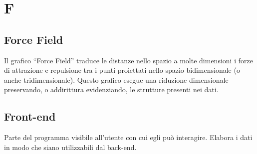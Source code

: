 \section*{F}
\markright{}
\subsection*{Force Field}
Il grafico “Force Field” traduce le distanze nello spazio a molte dimensioni i forze di attrazione e repulsione tra i punti proiettati nello spazio bidimensionale (o anche tridimensionale).
Questo grafico esegue una riduzione dimensionale preservando, o addirittura evidenziando, le strutture presenti nei dati.
\subsection*{Front-end}
Parte del programma visibile all'utente con cui egli può interagire. Elabora i dati in modo che siano utilizzabili dal back-end.